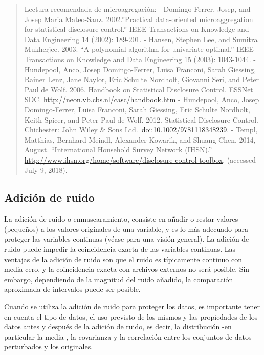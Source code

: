 \documentclass[]{book}
\theoremstyle{definition}
\theoremstyle{definition}
\theoremstyle{definition}
\theoremstyle{definition}
\theoremstyle{remark}
\begin{document}
\begin{quote}
Lectura recomendada de microagregación:
- Domingo-Ferrer, Josep, and Josep Maria Mateo-Sanz. 2002.''Practical data-oriented microaggregation for statistical disclosure control.'' IEEE Transactions on Knowledge and Data Engineering 14 (2002): 189-201.
- Hansen, Stephen Lee, and Sumitra Mukherjee. 2003. ``A polynomial algorithm for univariate optimal.'' IEEE Transactions on Knowledge and Data Engineering 15 (2003): 1043-1044.
- Hundepool, Anco, Josep Domingo-Ferrer, Luisa Franconi, Sarah Giessing, Rainer Lenz, Jane Naylor, Eric Schulte Nordholt, Giovanni Seri, and Peter Paul de Wolf. 2006. Handbook on Statistical Disclosure Control. ESSNet SDC. \url{http://neon.vb.cbs.nl/casc/handbook.htm}
- Hundepool, Anco, Josep Domingo-Ferrer, Luisa Franconi, Sarah Giessing, Eric Schulte Nordholt, Keith Spicer, and Peter Paul de Wolf. 2012. Statistical Disclosure Control. Chichester: John Wiley \& Sons Ltd.~\url{doi:10.1002/9781118348239}.
- Templ, Matthias, Bernhard Meindl, Alexander Kowarik, and Shuang Chen. 2014, August. ``International Household Survey Network (IHSN).'' \url{http://www.ihsn.org/home/software/disclosure-control-toolbox}. (accessed July 9, 2018).
\end{quote}

\hypertarget{adiciuxf3n-de-ruido}{%
\subsection{Adición de ruido}\label{adiciuxf3n-de-ruido}}

La adición de ruido o enmascaramiento, consiste en añadir o restar valores (pequeños) a los valores originales de una variable, y es lo más adecuado para proteger las variables continuas (véase \citep{Bran02} para una visión general). La adición de ruido puede impedir la coincidencia exacta de las variables continuas. Las ventajas de la adición de ruido son que el ruido es típicamente continuo con media cero, y la coincidencia exacta con archivos externos no será posible. Sin embargo, dependiendo de la magnitud del ruido añadido, la comparación aproximada de intervalos puede ser posible.

Cuando se utiliza la adición de ruido para proteger los datos, es importante tener en cuenta el tipo de datos, el uso previsto de los mismos y las propiedades de los datos antes y después de la adición de ruido, es decir, la distribución -en particular la media-, la covarianza y la correlación entre los conjuntos de datos perturbados y los originales.
\end{document}
